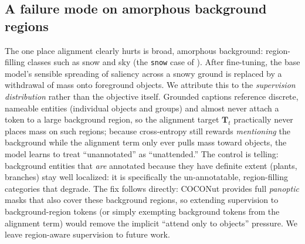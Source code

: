 \subsection{A failure mode on amorphous background regions}
\label{sec:analysis-regions}
The one place alignment clearly hurts is broad, amorphous background: region-filling classes such as snow and sky (the \texttt{snow} case of ). After fine-tuning, the base model's sensible spreading of saliency across a snowy ground is replaced by a withdrawal of mass onto foreground objects. We attribute this to the \emph{supervision distribution} rather than the objective itself. Grounded captions reference discrete, nameable entities (individual objects and groups) and almost never attach a token to a large background region, so the alignment target $\mathbf{T}_t$ practically never places mass on such regions; because cross-entropy still rewards \emph{mentioning} the background while the alignment term only ever pulls mass toward objects, the model learns to treat ``unannotated'' as ``unattended.'' The control is telling: background entities that \emph{are} annotated because they have definite extent (plants, branches) stay well localized: it is specifically the un-annotatable, region-filling categories that degrade. The fix follows directly: COCONut provides full \emph{panoptic} masks that also cover these background regions, so extending supervision to background-region tokens (or simply exempting background tokens from the alignment term) would remove the implicit ``attend only to objects'' pressure. We leave region-aware supervision to future work.
